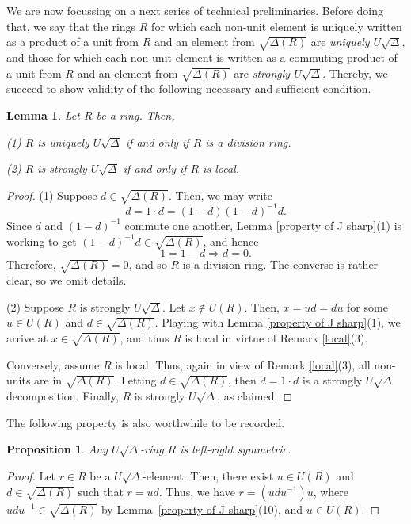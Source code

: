 \documentclass[11pt]{amsart}
\newtheorem{proposition}[theorem]{Proposition}
\newtheorem{lemma}[theorem]{Lemma}
\theoremstyle{definition}
\begin{document}
We are now focussing on a next series of technical preliminaries. Before doing that, we say that the rings $R$ for which each non-unit element is uniquely written as a product of a unit from $R$ and an element from $\sqrt{\Delta(R)}$ are {\it uniquely $U\sqrt{\Delta}$}, and those for which each non-unit element is written as a commuting product of a unit from $R$ and an element from $\sqrt{\Delta(R)}$ are {\it strongly $U\sqrt{\Delta}$}. Thereby, we succeed to show validity of the following necessary and sufficient condition.

\begin{lemma}
Let $R$ be a ring. Then,

(1) $R$ is uniquely $U\sqrt{\Delta}$ if and only if $R$ is a division ring.

(2) $R$ is strongly $U\sqrt{\Delta}$ if and only if $R$ is local.
\end{lemma}

\begin{proof}
(1) Suppose $d \in \sqrt{\Delta(R)}$. Then, we may write
\[
			d = 1 \cdot d = (1 - d)(1 - d)^{-1}d.
\]
Since $d$ and $(1 - d)^{-1}$ commute one another, Lemma \ref{property of J sharp}(1) is working to get $(1 - d)^{-1}d \in \sqrt{\Delta(R)}$, and hence
	\[
			1 = 1 - d \Rightarrow d = 0.
	\]
Therefore, $\sqrt{\Delta(R)} = 0$, and so $R$ is a division ring. The converse is rather clear, so we omit details.
			
(2) Suppose $R$ is strongly $U\sqrt{\Delta}$. Let $x \notin U(R)$. Then, $x = ud = du$ for some $u \in U(R)$ and $d \in \sqrt{\Delta(R)}$. Playing with Lemma \ref{property of J sharp}(1), we arrive at $x \in \sqrt{\Delta(R)}$, and thus $R$ is local in virtue of Remark \ref{local}(3).
			
Conversely, assume $R$ is local. Thus, again in view of Remark \ref{local}(3), all non-units are in $\sqrt{\Delta(R)}$. Letting $d \in \sqrt{\Delta(R)}$, then $d = 1 \cdot d$ is a strongly $U\sqrt{\Delta}$ decomposition. Finally, $R$ is strongly $U\sqrt{\Delta}$, as claimed.
\end{proof}

The following property is also worthwhile to be recorded.

\begin{proposition}
Any $U\sqrt{\Delta}$-ring $R$ is left-right symmetric.	
\end{proposition}

\begin{proof}
Let \( r \in R \) be a \( U\sqrt{\Delta} \)-element. Then, there exist \( u \in U(R) \) and \( d \in \sqrt{\Delta(R)} \) such that $r = ud$. Thus, we have $r = (u d u^{-1}) u$, where \( u d u^{-1} \in \sqrt{\Delta(R)} \) by
Lemma~\ref{property of J sharp}(10), and \( u \in U(R) \).
\end{proof}
\end{document}
